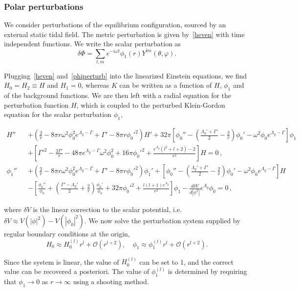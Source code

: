 \documentclass[aps,twocolumn,showpacs,preprintnumbers,nofootinbib,prd,superscriptaddress,groupedaddress,10pt]{revtex4-1}
\def\nn{\nonumber}
\def\be{\begin{equation}}
\def\ee{\end{equation}}
\newcommand{\beq}{\begin{eqnarray}}
\newcommand{\eeq}{\end{eqnarray}}
\begin{document}
\subsubsection{Polar perturbations}
We consider perturbations of the equilibrium configuration, sourced by an external static tidal field.
The metric perturbation is given by~\eqref{heven} with time independent functions.
%
We write the scalar perturbation as 
\be\label{phiperturb}
\delta\Phi = \sum_{l,m} e^{-i\omega t}\phi_1(r)Y^{lm}(\theta,\varphi).
\ee
%


Plugging~\eqref{heven}
and~\eqref{phiperturb} into the linearized Einstein equations, we find $H_0=H_2\equiv H$ and $H_1=0$,
whereas $K$ can be written as a function of $H$, $\phi_1$ and of the background functions.
We are then left with a radial equation for the perturbation function $H$, which is coupled to the perturbed Klein-Gordon equation for the scalar perturbation $\phi_1$,
%
\begin{widetext}
\beq
H'' &&+ \left(\frac{2}{r}-8\pi r \omega^2 \phi_0^2 e^{\Lambda_g-\Gamma} + \Gamma' - 8\pi r \phi_0'^2\right) H'
+32\pi \left[\phi_0'' - \left(\frac{\Lambda_g'+\Gamma'}{2} - \frac{2}{r}\right)\phi_0' - \omega^2 \phi_0 e^{\Lambda_g-\Gamma}\right] \phi_1 \nn\\
%
&&+\left[\Gamma'^2-\frac{2\Gamma'}{r}-48\pi e^{\Lambda_g-\Gamma}\omega^2\phi_0^2 + 16\pi\phi_0'^2 + \frac{e^{\Lambda_g}(l^2+l+2)-2}{r^2}\right] H = 0\,,\label{eqH}\\
%
\phi_1'' &&+ \left(\frac{2}{r} - 8\pi  r \omega^2\phi_0^2 e^{\Lambda_g-\Gamma}+\Gamma'-8\pi  r\phi_0'^2\right)\phi_1'
+ \left[\phi_0'' - \left(\frac{\Lambda_g'+\Gamma'}{2} - \frac{2}{r}\right)\phi_0' - \omega^2 \phi_0 e^{\Lambda_g-\Gamma}\right] H\nn\\
%
&&-\left[\frac{\phi_0''}{\phi_0} + \left(\frac{\Gamma'-\Lambda_g'}{2} + \frac{2}{r}\right)\frac{\phi_0'}{\phi_0} + 32\pi\phi_0'^2 + \frac{l(l+1) e^{\Lambda_g}}{r^2}\right]\phi_1  - \frac{d \delta V}{d|\phi^2|} e^{\Lambda_g}\phi_0=0\,,\label{eqphi1}
\eeq
\end{widetext}
%
where $\delta V$ is the linear correction to the scalar potential, i.e. $\delta V\approx V(|\phi|^2)-V(|\phi_0|^2)$.
We now solve the perturbation system 
supplied by regular boundary conditions at the origin,
%
\be
H_0 \approx H_0^{(l)} r^l + \mathcal{O}\left(r^{l+2}\right),\quad
\phi_1 \approx \phi_1^{(l)} r^l + \mathcal{O}\left(r^{l+2}\right).
\ee
%

Since the system is linear, the value of $H_0^{(l)}$ can be set to 1,
and the correct value can be recovered a posteriori. The value of
$\phi_1^{(l)}$ is determined by requiring that $\phi_1\to0$ as $r\to\infty$
using a shooting method.
\end{document}
